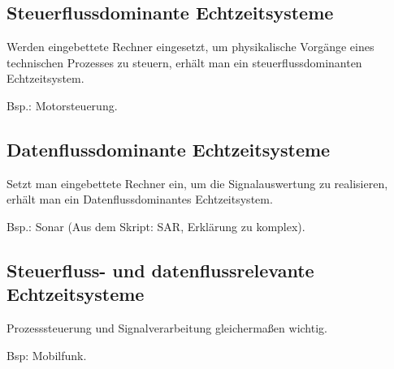 \subsection{Steuerflussdominante Echtzeitsysteme}
Werden eingebettete Rechner eingesetzt, um physikalische Vorgänge eines technischen
Prozesses zu steuern, erhält man ein steuerflussdominanten Echtzeitsystem.

Bsp.: Motorsteuerung.

\subsection{Datenflussdominante Echtzeitsysteme}
Setzt man eingebettete Rechner ein, um die Signalauswertung zu realisieren, erhält man ein
Datenflussdominantes Echtzeitsystem.

Bsp.: Sonar (Aus dem Skript: SAR, Erklärung zu komplex).

\subsection{Steuerfluss- und datenflussrelevante Echtzeitsysteme}
Prozesssteuerung und Signalverarbeitung gleichermaßen wichtig.

Bsp: Mobilfunk.
